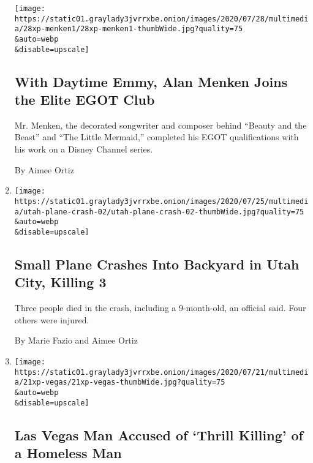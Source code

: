 \begin{enumerate}
  \texttt{[image: https://static01.graylady3jvrrxbe.onion/images/2020/07/28/multimedia/28xp-menken1/28xp-menken1-thumbWide.jpg?quality=75\\\&auto=webp\\\&disable=upscale]}

  \hypertarget{with-daytime-emmy-alan-menken-joins-the-elite-egot-club}{%
  \subsection{With Daytime Emmy, Alan Menken Joins the Elite EGOT
  Club}\label{with-daytime-emmy-alan-menken-joins-the-elite-egot-club}}

  Mr. Menken, the decorated songwriter and composer behind ``Beauty and
  the Beast'' and ``The Little Mermaid,'' completed his EGOT
  qualifications with his work on a Disney Channel series.

  By Aimee Ortiz
\item
  \href{/2020/07/25/us/plane-crash-west-jordan-utah.html}{}

  \texttt{[image: https://static01.graylady3jvrrxbe.onion/images/2020/07/25/multimedia/utah-plane-crash-02/utah-plane-crash-02-thumbWide.jpg?quality=75\\\&auto=webp\\\&disable=upscale]}

  \hypertarget{small-plane-crashes-into-backyard-in-utah-city-killing-3}{%
  \subsection{Small Plane Crashes Into Backyard in Utah City, Killing
  3}\label{small-plane-crashes-into-backyard-in-utah-city-killing-3}}

  Three people died in the crash, including a 9-month-old, an official
  said. Four others were injured.

  By Marie Fazio and Aimee Ortiz
\item
  \href{/2020/07/21/us/las-vegas-homeless-man-thrill-killing.html}{}

  \texttt{[image: https://static01.graylady3jvrrxbe.onion/images/2020/07/21/multimedia/21xp-vegas/21xp-vegas-thumbWide.jpg?quality=75\\\&auto=webp\\\&disable=upscale]}

  \hypertarget{las-vegas-man-accused-of-thrill-killing-of-a-homeless-man}{%
  \subsection{Las Vegas Man Accused of `Thrill Killing' of a Homeless
  Man}\label{las-vegas-man-accused-of-thrill-killing-of-a-homeless-man}}


\end{enumerate}
